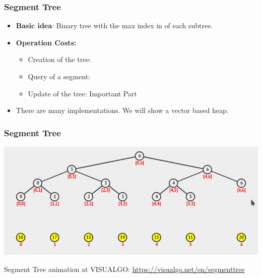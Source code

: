 \begin{frame}
  \frametitle{Segment Tree}

  \begin{itemize}
    \item {\bf Basic idea}: Binary tree with the max index in of each subtree.
    \bigskip

    \item {\bf Operation Costs:}
    \begin{itemize}
      \item Creation of the tree: 
      \item Query of a segment: 
      \item Update of the tree:  \hfill \alert{Important Part}
    \end{itemize}
    \bigskip

    \item There are many implementations. We will show a vector based heap.
  \end{itemize}
\end{frame}

\begin{frame}
  \frametitle{Segment Tree}
  \begin{center}
    \includegraphics[width=1\textwidth]{img/segment_tree}
  \end{center}

  \bigskip

  Segment Tree animation at VISUALGO: \url{https://visualgo.net/en/segmenttree}
\end{frame}

